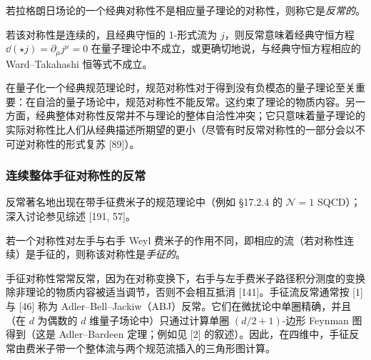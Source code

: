 \begin{definition}[17.32]
若拉格朗日场论的一个经典对称性不是相应量子理论的对称性，则称它是\emph{反常的}。
\end{definition}

若该对称性是连续的，且经典守恒的 1-形式流为 $j$，则反常意味着经典守恒方程 $\dd(\star j)=\partial_\mu j^\mu=0$ 在量子理论中不成立，或更确切地说，与经典守恒方程相应的 Ward--Takahashi 恒等式不成立。

\begin{remark}[17.33]
在量子化一个经典规范理论时，规范对称性对于得到没有负模态的量子理论至关重要：在自洽的量子场论中，规范对称性不能反常。这约束了理论的物质内容。另一方面，经典整体对称性反常并不与理论的整体自洽性冲突；它只意味着量子理论的实际对称性比人们从经典描述所期望的更小（尽管有时反常对称性的一部分会以不可逆对称性的形式复苏 [89]）。
\end{remark}

\subsubsection*{连续整体手征对称性的反常}

反常著名地出现在带手征费米子的规范理论中（例如 §17.2.4 的 $\mathcal{N}=1$ SQCD）；深入讨论参见综述 [191, 57]。

\begin{definition}[17.34]
若一个对称性对左手与右手 Weyl 费米子的作用不同，即相应的流（若对称性连续）是手征的，则称该对称性是\emph{手征的}。
\end{definition}

手征对称性常常反常，因为在对称变换下，右手与左手费米子路径积分测度的变换除非理论的物质内容被适当调节，否则不会相互抵消 [141]。手征流反常通常按 [1] 与 [46] 称为 Adler--Bell--Jackiw（ABJ）反常。它们在微扰论中单圈精确，并且（在 $d$ 为偶数的 $d$ 维量子场论中）只通过计算单圈 $(d/2+1)$-边形 Feynman 图得到（这是 Adler--Bardeen 定理；例如见 [2] 的叙述）。因此，在四维中，手征反常由费米子带一个整体流与两个规范流插入的三角形图计算。

